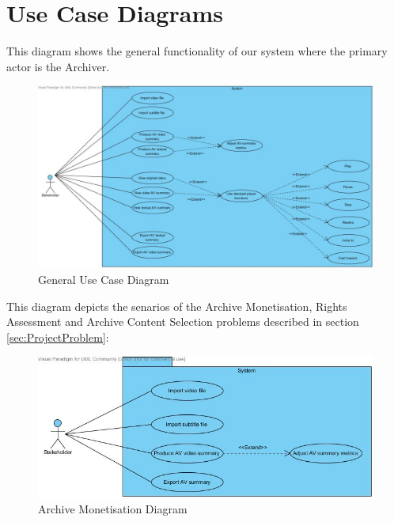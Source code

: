\newpage
\section{Use Case Diagrams}
\label{sec:UseCaseDiagrams}

This diagram shows the general functionality of our system where the primary actor is the Archiver. 

\begin{figure}[ht]
\begin{center}
\includegraphics[trim = 0mm 0mm 0mm 0mm, clip, scale=0.38]{Images/general_use_case_diagram.jpg}
\end{center}
\caption{General Use Case Diagram}
\end{figure}

This diagram depicts the senarios of the Archive Monetisation, Rights Assessment and Archive Content Selection problems described in section \ref{sec:ProjectProblem}:

\begin{figure}[ht]
\begin{center}
\includegraphics[trim = 0mm 0mm 0mm 0mm, clip, scale=0.61]{Images/archive_monetisation_use_case_diagram.jpg}
\end{center}
\caption{Archive Monetisation Diagram}
\end{figure}

